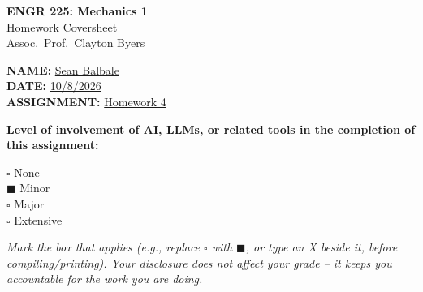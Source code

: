 \documentclass[11pt]{article}
\newcommand{\assignmentNumber}{4}
\newcommand{\assignedDate}{2 Oct 2026}
\newcommand{\dueDate}{8 Oct 2026 (11:59pm, Moodle)}
\begin{document}
\begin{titlepage}
    \centering
    \vspace*{2cm}
    {\LARGE \bfseries ENGR 225: Mechanics 1} \\[0.3cm]
    {\Large Homework Coversheet} \\[0.3cm]
    {\large Assoc.\ Prof.\ Clayton Byers} \\[2cm]

    \begin{flushleft}
        \Large
        \textbf{NAME:} \underline{\hspace{0.5cm}Sean Balbale\hspace{4cm}} \\[1cm]
        \textbf{DATE:} \underline{\hspace{0.5cm}10/8/2026\hspace{4cm}} \\[1cm]
        \textbf{ASSIGNMENT:} \underline{\hspace{0.5cm}Homework 4\hspace{3.2cm}} \\[2cm]
    \end{flushleft}

    \large
    \textbf{Level of involvement of AI, LLMs, or related tools in the completion of this assignment:}

    \vspace{1cm}

    \begin{flushleft}
        \Large
        $\square$ \quad None \\[0.7cm]
        $\blacksquare$ \quad Minor \\[0.7cm]
        $\square$ \quad Major \\[0.7cm]
        $\square$ \quad Extensive \\[1.5cm]
    \end{flushleft}

    \normalsize
    \textit{Mark the box that applies (e.g., replace $\square$ with $\blacksquare$, or type an X beside it, before compiling/printing). Your disclosure does not affect your grade -- it keeps you accountable for the work you are doing.}

\end{titlepage}

\end{document}
